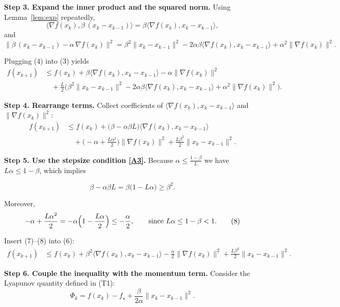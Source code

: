 \documentclass{article}
\begin{document}
\noindent\textbf{Step 3.  Expand the inner product and the squared norm.}  
Using Lemma~\ref{lem:exp} repeatedly,
\[
\big\langle\nabla f(x_{k}),\beta\,(x_{k}-x_{k-1})\big\rangle
   =\beta\langle\nabla f(x_{k}),x_{k}-x_{k-1}\rangle,
\]
and
\[
\Big\|\beta\,(x_{k}-x_{k-1})-\alpha\,\nabla f(x_{k})\Big\|^{2}
 =\beta^{2}\|x_{k}-x_{k-1}\|^{2}
   -2\alpha\beta\langle\nabla f(x_{k}),x_{k}-x_{k-1}\rangle
   +\alpha^{2}\|\nabla f(x_{k})\|^{2}.
\tag{4}
\]

Plugging (4) into (3) yields
\[
\begin{aligned}
f(x_{k+1})
&\le f(x_{k})
   +\beta\langle\nabla f(x_{k}),x_{k}-x_{k-1}\rangle
   -\alpha\|\nabla f(x_{k})\|^{2}\\
&\quad+\frac{L}{2}\Big(\beta^{2}\|x_{k}-x_{k-1}\|^{2}
   -2\alpha\beta\langle\nabla f(x_{k}),x_{k}-x_{k-1}\rangle
   +\alpha^{2}\|\nabla f(x_{k})\|^{2}\Big).
\end{aligned}
\tag{5}
\]

\noindent\textbf{Step 4.  Rearrange terms.}  
Collect coefficients of $\langle\nabla f(x_{k}),x_{k}-x_{k-1}\rangle$ and $\|\nabla f(x_{k})\|^{2}$:
\[
\begin{aligned}
f(x_{k+1})
&\le f(x_{k})
   +\Big(\beta-\alpha\beta L\Big)\langle\nabla f(x_{k}),x_{k}-x_{k-1}\rangle\\
&\quad+\Big(-\alpha+\tfrac{L\alpha^{2}}{2}\Big)\|\nabla f(x_{k})\|^{2}
   +\tfrac{L\beta^{2}}{2}\|x_{k}-x_{k-1}\|^{2}.
\end{aligned}
\tag{6}
\]

\noindent\textbf{Step 5.  Use the stepsize condition \eqref{A3}.}  
Because $\alpha\le\frac{1-\beta}{L}$ we have $L\alpha\le 1-\beta$, which implies  

\[
\beta-\alpha\beta L = \beta\bigl(1-L\alpha\bigr)\ge\beta^{2}.
\tag{7}
\]

Moreover,
\[
-\alpha+\frac{L\alpha^{2}}{2}
= -\alpha\Bigl(1-\frac{L\alpha}{2}\Bigr)
\le -\frac{\alpha}{2},
\qquad\text{since }L\alpha\le 1-\beta<1.
\tag{8}
\]

Insert (7)–(8) into (6):
\[
\begin{aligned}
f(x_{k+1})
&\le f(x_{k})
   +\beta^{2}\langle\nabla f(x_{k}),x_{k}-x_{k-1}\rangle
   -\frac{\alpha}{2}\|\nabla f(x_{k})\|^{2}
   +\frac{L\beta^{2}}{2}\|x_{k}-x_{k-1}\|^{2}.
\end{aligned}
\tag{9}
\]

\noindent\textbf{Step 6.  Couple the inequality with the momentum term.}  
Consider the Lyapunov quantity defined in (T1):
\[
\Phi_{k}=f(x_{k})-f_{\star}+\frac{\beta}{2\alpha}\|x_{k}-x_{k-1}\|^{2}.
\]
\end{document}

